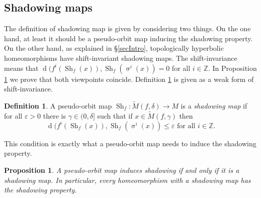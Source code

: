 \documentclass[12pt]{amsart}
\DeclareMathOperator{\shift}{\sigma}
\theoremstyle{plain}
\newtheorem{prop}[thm]{Proposition}
\theoremstyle{definition}
\newtheorem{rmk}[thm]{Remark}
\newtheorem{df}[thm]{Definition}
\theoremstyle{remark}
\DeclareMathOperator{\dist}{d}
\DeclareMathOperator{\shm}{Sh}
\newcommand{\Z}{\mathbb Z}
\renewcommand{\epsilon}{\varepsilon}
\newcommand{\tM}{\tilde{M}}
\newcommand{\azul}[1]{\textcolor{blue}{#1}}
\begin{document}
\subsection{Shadowing maps}
\label{secShadowing maps}
The definition of shadowing map is given by considering two things. On the one hand, at least it should be a pseudo-orbit map inducing the shadowing property.
On the other hand, as explained in \S\ref{secIntro}, topologically hyperbolic homeomorphisms have shift-invariant shadowing maps.
The shift-invariance means that $\dist(f^i(\shm_f(x)),\shm_f(\shift^i(x))=0$ for all $i\in\Z$.
In Proposition \ref{propShmSH} we prove that both viewpoints coincide.
Definition \ref{dfShm}
is given as a weak form of shift-invariance.
\begin{df}
	\label{dfShm}
	A pseudo-orbit map
	$\shm_f\colon \tM(f,\delta)\to M$
	is a \textit{shadowing map} if
	for all $\epsilon>0$ there is $\gamma\in(0,\delta]$ such that if $x\in \tM(f,\gamma)$ then
	\begin{equation}
		\label{ecuShm}
		\dist(f^i(\shm_f(x)),\shm_f(\shift^i(x))\leq\epsilon\text{ for all }i\in\Z.
	\end{equation}
\end{df}
This condition is exactly what a pseudo-orbit map needs to induce the shadowing property.
\begin{prop}
	\label{propShmSH} A pseudo-orbit map induces shadowing if and only if it is a shadowing map.
	In particular, every homeomorphism with a shadowing map has the shadowing property.
\end{prop}
\end{document}
